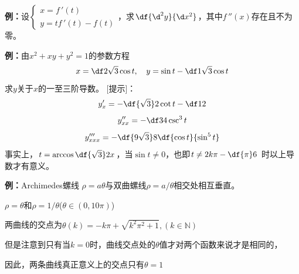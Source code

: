 {\bf 例：}设$\left\{\begin{array}{l}x=f\,'(t)\\ y=tf\,'(t)-f(t)
\end{array}\right.$，求$\df{\d^2y}{\d x^2}$，其中$f\,''(x)$存在且不为零。

{\bf 例：}由$x^2+xy+y^2=1$的参数方程
$$x=\df2{\sqrt3}\cos t,\quad y=\sin t-\df1{\sqrt3}\cos t$$
求$y$关于$x$的一至三阶导数。
[提示]：
$$y'_x=-\df{\sqrt3}2\cot t-\df12$$
$$y''_{xx}=-\df34\csc^3t$$
$$y'''_{xxx}=-\df{9\sqrt3}8\df{\cos t}{\sin^5t}$$
事实上，$t=\arccos\df{\sqrt3}2x$，当$\sin t\ne0$，也即$t\ne2k\pi-\df{\pi}6$
时以上导数才有意义。

\begin{shaded}
	{\bf 例：}{\kaishu Archimedes螺线}
	$\rho=a\theta$与双曲螺线$\rho=a/\theta$相交处相互垂直。

	\begin{center}
		
		{\kaishu$\rho=\theta$和$\rho=1/\theta$\quad($\theta\in(0,10\pi)$)
		
		两曲线的交点为$\theta(k)=-k\pi+\sqrt{k^2\pi^2+1},(k\in\mathbb{N})$
		
		但是注意到只有当$k=0$时，曲线交点处的$\theta$值才对两个函数来说才是相同的，
		
		因此，两条曲线真正意义上的交点只有$\theta=1$
		}
	\end{center}
	

\end{shaded}
